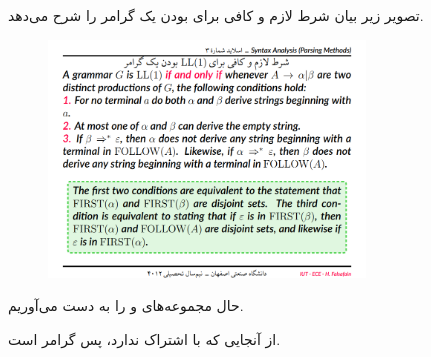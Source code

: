 \documentclass{article}
\begin{document}
تصویر زیر بیان شرط لازم و کافی برای  بودن یک گرامر را شرح می‌دهد.
\begin{figure}[H]
    \centering
    \includegraphics[width=0.75\textwidth]{figures/3a.png}
    \caption
	{}
    \label{fig:fig1}
\end{figure}

حال مجموعه‌های  و  را به دست می‌آوریم.
\begin{latin}
\begin{table}[H]
\end{table}
\end{latin}
از آنجایی که  با  اشتراک ندارد، پس  گرامر  است.



\end{document}
